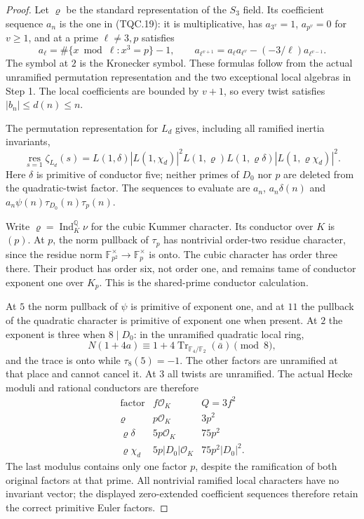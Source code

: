 \begin{proof}
Let $\varrho$ be the standard representation of the $S_3$ field.
Its coefficient sequence $a_n$ is the one in (TQC.19): it is
multiplicative, has $a_{3^v}=1$, $a_{p^v}=0$ for $v\ge1$,
and at a prime $\ell\ne3,p$ satisfies
\[
 a_\ell=\#\{x\bmod\ell:x^3=p\}-1,
 \qquad
 a_{\ell^{v+1}}=a_\ell a_{\ell^v}-(-3/\ell)a_{\ell^{v-1}}.
 \tag{G137.10}
\]
The symbol at $2$ is the Kronecker symbol.
These formulas follow from the actual unramified permutation
representation and the two exceptional local algebras in Step 1.
The local coefficients are bounded by $v+1$, so every twist
satisfies $|b_n|\le d(n)\le n$.

The permutation representation for $L_d$ gives, including all
ramified inertia invariants,
\[
 \operatorname*{res}_{s=1}\zeta_{L_d}(s)
 =L(1,\delta)|L(1,\chi_d)|^2
     L(1,\varrho)L(1,\varrho\delta)|L(1,\varrho\chi_d)|^2.
 \tag{G137.11}
\]
Here $\delta$ is primitive of conductor five; neither primes of
$D_0$ nor $p$ are deleted from the quadratic-twist factor.
The sequences to evaluate are $a_n$, $a_n\delta(n)$ and
$a_n\psi(n)\tau_{D_0}(n)\tau_p(n)$.

Write $\varrho=\operatorname{Ind}_K^{\mathbb Q}\nu$ for the
cubic Kummer character.  Its conductor over $K$ is $(p)$.
At $p$, the norm pullback of $\tau_p$ has nontrivial order-two
residue character, since the residue norm
$\mathbb F_{p^2}^{\times}\to\mathbb F_p^{\times}$ is onto.
The cubic character has order three there.  Their product has
order six, not order one, and remains tame of conductor exponent
one over $K_p$.  This is the shared-prime conductor calculation.

At $5$ the norm pullback of $\psi$ is primitive of exponent one,
and at $11$ the pullback of the quadratic character is primitive
of exponent one when present.  At $2$ the exponent is three
when $8\mid D_0$: in the unramified quadratic local ring,
\[
 N(1+4a)\equiv1+4\operatorname{Tr}_{\mathbb F_4/\mathbb F_2}(\bar a)
                      \pmod8,
 \tag{G137.12}
\]
and the trace is onto while $\tau_8(5)=-1$.
The other factors are unramified at that place and cannot cancel it.
At $3$ all twists are unramified.
The actual Hecke moduli and rational conductors are therefore
\[
\begin{array}{c|c|c}
\text{factor}&f\mathcal O_K&Q=3f^2\\\hline
\varrho&p\mathcal O_K&3p^2\\
\varrho\delta&5p\mathcal O_K&75p^2\\
\varrho\chi_d&5p|D_0|\mathcal O_K&75p^2|D_0|^2.
\end{array}
\tag{G137.13}
\]
The last modulus contains only one factor $p$, despite the
ramification of both original factors at that prime.
All nontrivial ramified local characters have no invariant vector;
the displayed zero-extended coefficient sequences therefore retain
the correct primitive Euler factors.


\end{proof}

